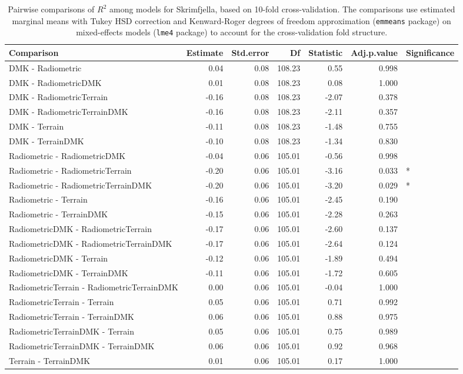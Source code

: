 \documentclass[soil, manuscript]{copernicus}
\begin{document}
\clearpage

\begin{table}[h]

\caption{\label{tab:pairwiseSkrimRsq}Pairwise comparisons of $R^2$ among models for Skrimfjella, based on 10-fold cross-validation. The comparisons use estimated marginal means with Tukey HSD correction and Kenward-Roger degrees of freedom approximation (\texttt{emmeans} package) on mixed-effects models (\texttt{lme4} package) to account for the cross-validation fold structure.}
\centering
\begin{tabular}[t]{lrrrrrl}
\hline
Comparison & Estimate & Std.error & Df & Statistic & Adj.p.value & Significance\\
\hline
DMK - Radiometric & 0.04 & 0.08 & 108.23 & 0.55 & 0.998 & \\
DMK - RadiometricDMK & 0.01 & 0.08 & 108.23 & 0.08 & 1.000 & \\
DMK - RadiometricTerrain & -0.16 & 0.08 & 108.23 & -2.07 & 0.378 & \\
DMK - RadiometricTerrainDMK & -0.16 & 0.08 & 108.23 & -2.11 & 0.357 & \\
DMK - Terrain & -0.11 & 0.08 & 108.23 & -1.48 & 0.755 & \\
DMK - TerrainDMK & -0.10 & 0.08 & 108.23 & -1.34 & 0.830 & \\
Radiometric - RadiometricDMK & -0.04 & 0.06 & 105.01 & -0.56 & 0.998 & \\
Radiometric - RadiometricTerrain & -0.20 & 0.06 & 105.01 & -3.16 & 0.033 & *\\
Radiometric - RadiometricTerrainDMK & -0.20 & 0.06 & 105.01 & -3.20 & 0.029 & *\\
Radiometric - Terrain & -0.16 & 0.06 & 105.01 & -2.45 & 0.190 & \\
Radiometric - TerrainDMK & -0.15 & 0.06 & 105.01 & -2.28 & 0.263 & \\
RadiometricDMK - RadiometricTerrain & -0.17 & 0.06 & 105.01 & -2.60 & 0.137 & \\
RadiometricDMK - RadiometricTerrainDMK & -0.17 & 0.06 & 105.01 & -2.64 & 0.124 & \\
RadiometricDMK - Terrain & -0.12 & 0.06 & 105.01 & -1.89 & 0.494 & \\
RadiometricDMK - TerrainDMK & -0.11 & 0.06 & 105.01 & -1.72 & 0.605 & \\
RadiometricTerrain - RadiometricTerrainDMK & 0.00 & 0.06 & 105.01 & -0.04 & 1.000 & \\
RadiometricTerrain - Terrain & 0.05 & 0.06 & 105.01 & 0.71 & 0.992 & \\
RadiometricTerrain - TerrainDMK & 0.06 & 0.06 & 105.01 & 0.88 & 0.975 & \\
RadiometricTerrainDMK - Terrain & 0.05 & 0.06 & 105.01 & 0.75 & 0.989 & \\
RadiometricTerrainDMK - TerrainDMK & 0.06 & 0.06 & 105.01 & 0.92 & 0.968 & \\
Terrain - TerrainDMK & 0.01 & 0.06 & 105.01 & 0.17 & 1.000 & \\
\hline
\end{tabular}
\end{table}
\clearpage
\end{document}
